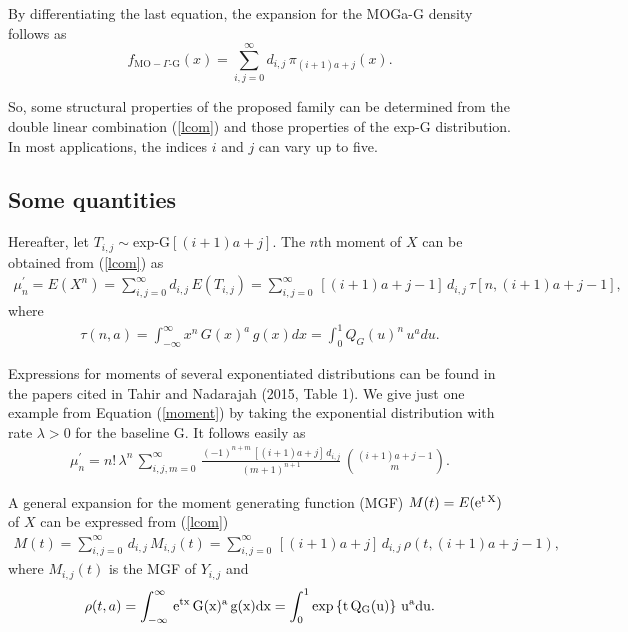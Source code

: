 \documentclass[twoside,leqno,11pt]{article}
\begin{document}
By differentiating the last equation, the expansion for the MOGa-G density follows as
\begin{equation}\label{lcom}
f_{\text{MO}-\Gamma\text{-G}}(x)=\sum_{i,j=0}^\infty d_{i,j}\,\pi_{(i+1)a+j}(x).
\end{equation}

So, some structural properties of the proposed family can be determined from the double linear combination (\ref{lcom})
and those properties of the exp-G distribution. In most applications, the indices $i$ and $j$ can vary up to five.


\subsection{Some quantities}

Hereafter, let $T_{i,j}\sim$exp-G$[(i+1)a+j]$. The $n$th moment of $X$ can be obtained from (\ref{lcom}) as
{\footnotesize
\begin{eqnarray}\label{moment}
\displaystyle
\mu_n^{\prime}=E(X^n)=\sum_{i,j=0}^\infty d_{i,j}\,E(T_{i,j})=\sum_{i,j=0}^\infty \,[(i+1)a+j-1]\,d_{i,j}\,\tau[n,(i+1)a+j-1],
\end{eqnarray}
}
where
\begin{eqnarray*}
\tau(n,a)=\int_{-\infty}^{\infty} x^n\,G(x)^{a}\,g(x)dx=\int_{0}^{1} Q_G(u)^n\,u^a d u.
\end{eqnarray*}

Expressions for moments of several exponentiated distributions can be found in the papers
cited in Tahir and Nadarajah (2015, Table 1). We give just one example from Equation (\ref{moment})
by taking the exponential distribution with rate $\lambda>0$ for the baseline G.
It follows easily as
\begin{eqnarray*}
\mu_n^{\prime}= n!\,\lambda^n\,\sum_{i,j,m=0}^\infty \,\frac{(-1)^{n+m}\,[(i+1)a+j]\,d_{i,j}}{(m+1)^{n+1}}\,\binom{(i+1)a+j-1}{m}.
\end{eqnarray*}

A general expansion for the moment generating function (MGF) $M(t)=E(\rm{e}^{t\,X})$ of $X$ can be expressed from (\ref{lcom})
{\footnotesize
\begin{eqnarray}\label{mgf}
\displaystyle
M(t)=\sum_{i,j=0}^{\infty} \,d_{i,j}\,M_{i,j}(t)=\sum_{i,j=0}^{\infty}\, [(i+1)a+j]\,d_{i,j}\,\rho(t,(i+1)a+j-1),
\end{eqnarray}
}
where $M_{i,j}(t)$ is the MGF of $Y_{i,j}$ and
\begin{eqnarray*}
\rho(t,a)=\int_{-\infty}^{\infty}\,\rm{e}^{t x}\,G(x)^{a}\,g(x) dx=\int_{0}^{1}\exp\left\{t\,Q_G(u)\right\}\,u^a d u.
\end{eqnarray*}
\end{document}
